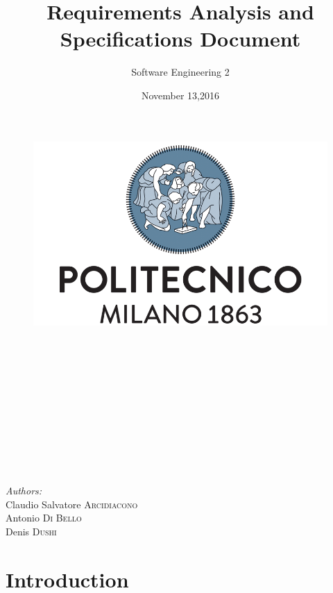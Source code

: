 \documentclass[a4paper]{article}
\title{Requirements Analysis and Specifications Document}
\author{Software Engineering 2}
\date{November 13,2016}
\begin{document}
\maketitle

\begin{figure}[h]
  \centering
  \includegraphics[width=300 pt]{resources/polimi.png}
  \label{fig:polimi}
\end{figure}

\emph{\\}
\emph{\\}
\emph{\\}
\emph{\\}
\emph{\\}
\emph{\\}
\emph{\\}
\emph{\\}
\emph{\\}
\emph{\\}

\begin{minipage}{0.4\textwidth}
\begin{flushleft} \large
\emph{Authors:}\\
Claudio Salvatore \textsc{Arcidiacono}\\
Antonio \textsc{Di Bello}\\
Denis \textsc{Dushi}
\end{flushleft}
\end{minipage}

\begin{minipage}{0.4\textwidth}

\end{minipage}

\newpage
{}

\tableofcontents

\newpage

\section{Introduction}

\end{document}
